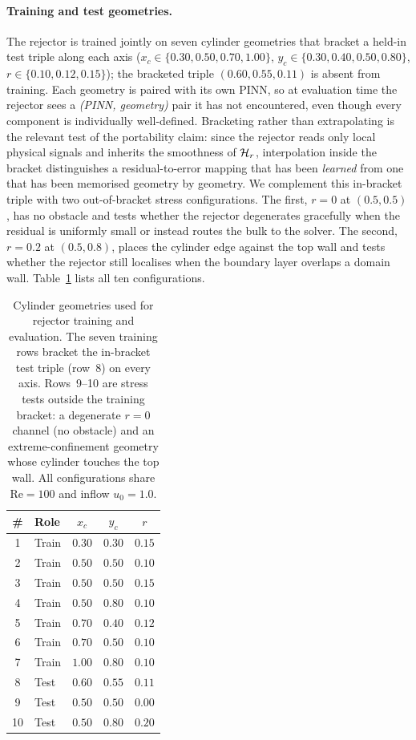 \paragraph{Training and test geometries.}
The rejector is trained jointly on seven cylinder geometries that
bracket a held-in test triple along each axis
($x_c\in\{0.30,0.50,0.70,1.00\}$, $y_c\in\{0.30,0.40,0.50,0.80\}$,
$r\in\{0.10,0.12,0.15\}$); the bracketed triple $(0.60,0.55,0.11)$ is
absent from training. Each geometry is paired with its own PINN, so
at evaluation time the rejector sees a \emph{(PINN, geometry)} pair it
has not encountered, even though every component is individually
well-defined. Bracketing rather than extrapolating is the relevant
test of the portability claim: since the rejector reads only local
physical signals and inherits the smoothness of $\mathcal{H}_r$,
interpolation inside the bracket distinguishes a residual-to-error
mapping that has been \emph{learned} from one that has been memorised
geometry by geometry. We complement this in-bracket triple with two
out-of-bracket stress configurations. The first, $r=0$ at $(0.5,0.5)$,
has no obstacle and tests whether the rejector degenerates gracefully
when the residual is uniformly small or instead routes the bulk to
the solver. The second, $r=0.2$ at $(0.5,0.8)$, places the cylinder
edge against the top wall and tests whether the rejector still
localises when the boundary layer overlaps a domain wall.
Table~\ref{tab:cyl-train} lists all ten configurations.

\begin{table}[t]
  \caption{Cylinder geometries used for rejector training and
    evaluation. The seven training rows bracket the in-bracket test
    triple (row~8) on every axis. Rows~9--10 are stress tests outside
    the training bracket: a degenerate $r=0$ channel (no obstacle) and
    an extreme-confinement geometry whose cylinder touches the top
    wall. All configurations share $\mathrm{Re}=100$ and inflow
    $u_0=1.0$.}
  \label{tab:cyl-train}
  \centering
  \small
  \begin{tabular}{clccc}
    \toprule
    \# & Role & $x_c$ & $y_c$ & $r$ \\
    \midrule
    1  & Train & $0.30$ & $0.30$ & $0.15$ \\
    2  & Train & $0.50$ & $0.50$ & $0.10$ \\
    3  & Train & $0.50$ & $0.50$ & $0.15$ \\
    4  & Train & $0.50$ & $0.80$ & $0.10$ \\
    5  & Train & $0.70$ & $0.40$ & $0.12$ \\
    6  & Train & $0.70$ & $0.50$ & $0.10$ \\
    7  & Train & $1.00$ & $0.80$ & $0.10$ \\
    \midrule
    8  & Test  & $0.60$ & $0.55$ & $0.11$ \\
    9  & Test  & $0.50$ & $0.50$ & $0.00$ \\
    10 & Test  & $0.50$ & $0.80$ & $0.20$ \\
    \bottomrule
  \end{tabular}
\end{table}

